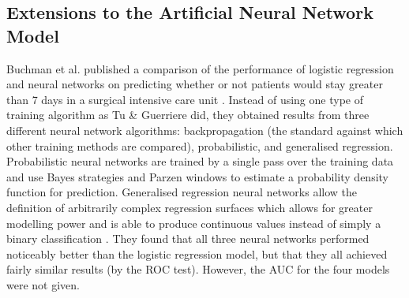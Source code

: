 \subsection{Extensions to the Artificial Neural Network Model}
Buchman et al. published a comparison of the performance of logistic regression
and neural networks on predicting whether or not patients would stay greater
than 7 days in a surgical intensive care unit \citep{Buchman1994}. Instead of
using one type of training algorithm as Tu \& Guerriere did, they obtained
results from three different neural network algorithms: backpropagation (the
standard against which other training methods are compared), probabilistic, and
generalised regression. Probabilistic neural networks are trained by a single
pass over the training data and use Bayes strategies and Parzen windows to
estimate a probability density function for prediction. Generalised regression
neural networks allow the definition of arbitrarily complex regression surfaces
which allows for greater modelling power and is able to produce continuous
values instead of simply a binary classification \citep{Sprecht1991}. They found
that all three neural networks performed noticeably better than the logistic
regression model, but that they all achieved fairly similar results (by the ROC
test). However, the AUC for the four models were not given.

